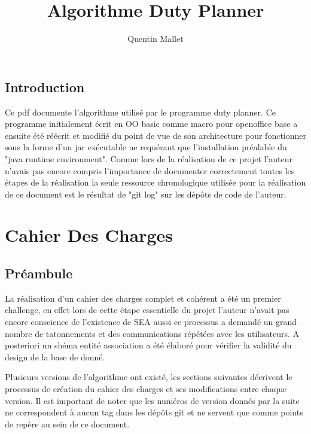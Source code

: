 \documentclass[11pt]{report}
\begin{document}
\title{Algorithme Duty Planner}

\author{Quentin Mallet}


\maketitle

\tableofcontents

\newpage

\section{Introduction}
Ce pdf documente l'algorithme utilisé par le programme duty planner.
Ce programme initialement écrit en OO basic\cite{basicguide} comme macro pour openoffice base\cite{base} a ensuite été réécrit et modifié du point de vue de son architecture pour fonctionner sous la forme d'un jar exécutable ne requérant que l'installation préalable du "java runtime environment". 
Comme lors de la réalisation de ce projet l'auteur n'avais pas encore compris l'importance de documenter correctement toutes les étapes de la réalisation la seule ressource chronologique utilisée pour la réalisation de ce document est le résultat de "git log" sur les dépôts de code de l'auteur.

\chapter{Cahier Des Charges}
\section{Préambule}
La réalisation d'un cahier des charges complet et cohérent a été un premier challenge, en effet lors de cette étape essentielle du projet l'auteur n'avait pas encore conscience de l'existence de SEA\cite{sea} aussi ce processus a demandé un grand nombre de tatonnements et des communications répétées avec les utilisateurs. 
A posteriori un shéma entité association a été élaboré pour vérifier la validité du design de la base de donné.

Plusieurs versions de l'algorithme ont existé, les sections suivantes décrivent le processus de création du cahier des charges et ses modifications entre chaque version. 
Il est important de noter que les numéros de version donnés par la suite ne correspondent à aucun tag dans les dépôts git et ne servent que comme points de repère au sein de ce document.
\end{document}
